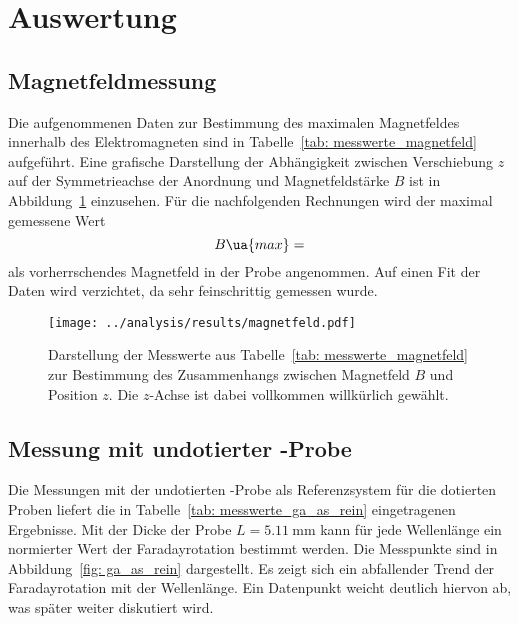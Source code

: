 \section{Auswertung}

\subsection{Magnetfeldmessung}
Die aufgenommenen Daten zur Bestimmung des maximalen Magnetfeldes innerhalb des Elektromagneten 
sind in Tabelle~\ref{tab: messwerte_magnetfeld} aufgeführt. Eine grafische Darstellung der Abhängigkeit zwischen Verschiebung 
$z$ auf der Symmetrieachse der Anordnung und Magnetfeldstärke $B$ ist in Abbildung~\ref{fig: magnetfeld} einzusehen. 
Für die nachfolgenden Rechnungen wird der maximal gemessene Wert 
\begin{equation}
    B\ua{max} = 
\end{equation}
als vorherrschendes Magnetfeld in der Probe angenommen. Auf einen Fit der Daten wird verzichtet, 
da sehr feinschrittig gemessen wurde.

\begin{figure}
\centering
\texttt{[image: ../analysis/results/magnetfeld.pdf]}
\caption{Darstellung der Messwerte aus Tabelle~\ref{tab: messwerte_magnetfeld} zur Bestimmung des Zusammenhangs zwischen 
Magnetfeld $B$ und Position $z$. Die $z$-Achse ist dabei vollkommen willkürlich gewählt.}
\label{fig: magnetfeld}
\end{figure}






\subsection{Messung mit undotierter -Probe}
Die Messungen mit der undotierten -Probe als Referenzsystem für die dotierten Proben liefert die 
in Tabelle~\ref{tab: messwerte_ga_as_rein} eingetragenen Ergebnisse. Mit der Dicke der Probe $L = \SI{5.11}{\milli\meter}$ kann für jede 
Wellenlänge ein normierter Wert der Faradayrotation bestimmt werden. Die Messpunkte sind in Abbildung~\ref{fig: ga_as_rein}
dargestellt. Es zeigt sich ein abfallender Trend der Faradayrotation mit der Wellenlänge. Ein Datenpunkt weicht deutlich 
hiervon ab, was später weiter diskutiert wird.  



